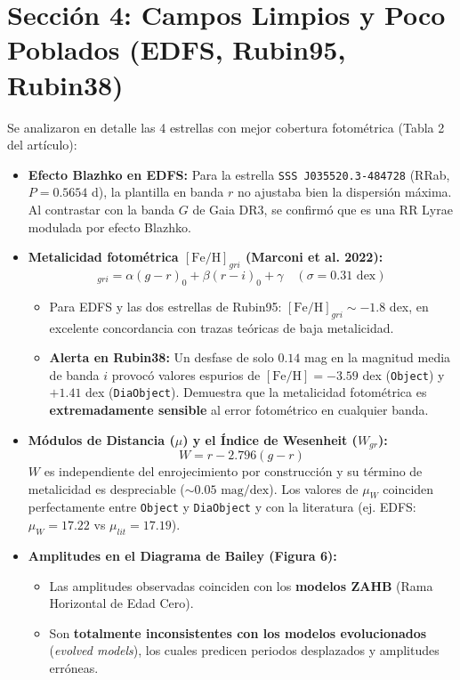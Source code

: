 \documentclass[11pt,a4paper]{article}
\begin{document}
\section{Sección 4: Campos Limpios y Poco Poblados (EDFS, Rubin95, Rubin38)}
Se analizaron en detalle las 4 estrellas con mejor cobertura fotométrica (Tabla 2 del artículo):
\begin{itemize}
    \item \textbf{Efecto Blazhko en EDFS:} Para la estrella \texttt{SSS J035520.3-484728} (RRab, $P = 0.5654$ d), la plantilla en banda $r$ no ajustaba bien la dispersión máxima. Al contrastar con la banda $G$ de Gaia DR3, se confirmó que es una RR Lyrae modulada por efecto Blazhko.
    \item \textbf{Metalicidad fotométrica $[\text{Fe/H}]_{gri}$ (Marconi et al. 2022):}
    \begin{equation*}
        [\text{Fe/H}]_{gri} = \alpha(g - r)_0 + \beta(r - i)_0 + \gamma \quad (\sigma = 0.31\text{ dex})
    \end{equation*}
    \begin{itemize}
        \item Para EDFS y las dos estrellas de Rubin95: $[\text{Fe/H}]_{gri} \sim -1.8$ dex, en excelente concordancia con trazas teóricas de baja metalicidad.
        \item \textbf{Alerta en Rubin38:} Un desfase de solo $0.14$ mag en la magnitud media de banda $i$ provocó valores espurios de $[\text{Fe/H}] = -3.59$ dex (\texttt{Object}) y $+1.41$ dex (\texttt{DiaObject}). Demuestra que la metalicidad fotométrica es \textbf{extremadamente sensible} al error fotométrico en cualquier banda.
    \end{itemize}
    \item \textbf{Módulos de Distancia ($\mu$) y el Índice de Wesenheit ($W_{gr}$):}
    \begin{equation*}
        W = r - 2.796(g - r)
    \end{equation*}
    $W$ es independiente del enrojecimiento por construcción y su término de metalicidad es despreciable ($\sim 0.05\text{ mag/dex}$). Los valores de $\mu_W$ coinciden perfectamente entre \texttt{Object} y \texttt{DiaObject} y con la literatura (ej. EDFS: $\mu_W = 17.22$ vs $\mu_{lit} = 17.19$).
    \item \textbf{Amplitudes en el Diagrama de Bailey (Figura 6):}
    \begin{itemize}
        \item Las amplitudes observadas coinciden con los \textbf{modelos ZAHB} (Rama Horizontal de Edad Cero).
        \item Son \textbf{totalmente inconsistentes con los modelos evolucionados} (\textit{evolved models}), los cuales predicen periodos desplazados y amplitudes erróneas.
    \end{itemize}
\end{itemize}
\end{document}
